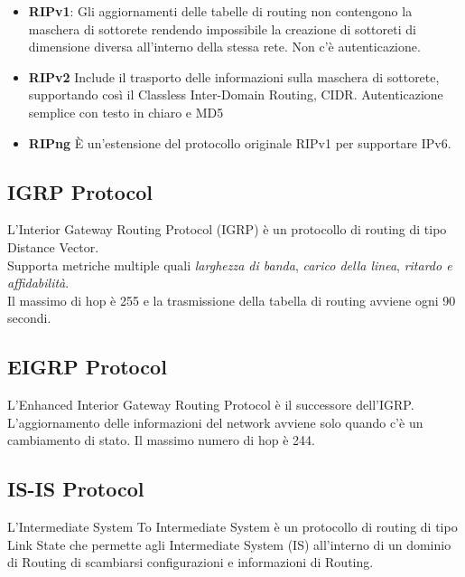 \documentclass{article}
\begin{document}
\begin{itemize}
    \item \textbf{RIPv1}: Gli aggiornamenti delle tabelle di routing non contengono
        la maschera di sottorete rendendo impossibile la creazione di sottoreti di dimensione
        diversa all'interno della stessa rete. Non c'è autenticazione.

    \item \textbf{RIPv2} Include il trasporto delle informazioni sulla maschera
        di sottorete, supportando così il Classless Inter-Domain Routing, CIDR.
        Autenticazione semplice con testo in chiaro e MD5
    \item \textbf{RIPng} È un’estensione del protocollo originale RIPv1 per supportare IPv6.
\end{itemize}

\pagebreak

\subsection{IGRP Protocol}

L'Interior Gateway Routing Protocol (IGRP) è un protocollo di routing di tipo Distance Vector.
\\
Supporta metriche multiple quali \textit{larghezza di banda}, \textit{carico della linea},
\textit{ritardo e affidabilità}.
\\
Il massimo di hop è 255 e la trasmissione della tabella di routing avviene ogni 90 secondi.

\subsection{EIGRP Protocol}

L'Enhanced Interior Gateway Routing Protocol è il successore dell'IGRP.
\\
L'aggiornamento delle informazioni del network avviene solo quando c'è un cambiamento di stato.
Il massimo numero di hop è 244.

\subsection{IS-IS Protocol}

L'Intermediate System To Intermediate System è un protocollo di routing di tipo Link
State che permette agli Intermediate System (IS) all'interno di un dominio di Routing di scambiarsi
configurazioni e informazioni di Routing.
\end{document}
